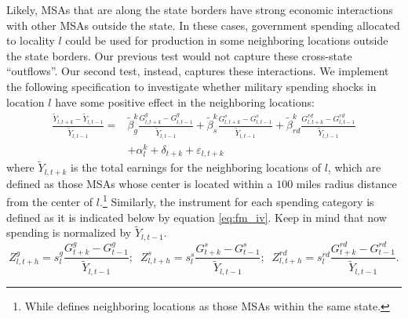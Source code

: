\documentclass[dv_diss_main.tex]{subfiles}
\begin{document}
Likely, MSAs that are along the state borders have strong economic interactions with other MSAs outside the state. In these cases, government spending allocated to locality $l$ could be used for production in some neighboring locations outside the state borders. Our previous test would not capture these cross-state ``outflows''. Our second test, instead, captures these interactions. We implement the following specification to investigate whether military spending shocks in location $l$ have some positive effect in the neighboring locations:
\begin{equation}
\begin{split}
    \frac{\tilde{Y}_{l,t+k} - \tilde{Y}_{l,t-1}}{\tilde{Y}_{l,t-1}} = & \tilde{\beta}_{g}^k \frac{G^{g}_{l,t+k}-G^{g}_{l,t-1}}{\tilde{Y}_{l,t-1}} + \tilde{\beta}_{s}^k \frac{G^{s}_{l,t+k}-G^{s}_{l,t-1}}{\tilde{Y}_{l,t-1}} + \tilde{\beta}_{rd}^k \frac{G^{rd}_{l,t+k}-G^{rd}_{l,t-1}}{\tilde{Y}_{l,t-1}} 
    \\ & + \alpha_l^k + \delta_{t+k} + \varepsilon_{l,t+k}
    \label{eq:fm_spill}
\end{split}
\end{equation}
\noindent where $\tilde{Y}_{l,t+k}$ is the total earnings for the neighboring locations of $l$, which are defined as those MSAs whose center is located within a $100$ miles radius distance from the center of $l$.\footnote{While \cite{Auerbach2020} defines neighboring locations as those MSAs within the same state.%
} Similarly, the instrument for each spending category is defined as it is indicated below by equation \ref{eq:fm_iv}. Keep in mind that now spending is normalized by $\tilde{Y}_{l,t-1}$. 
\begin{equation}
    Z_{l,t+h}^g = s_{l}^g \frac{G^g_{t+k}-G^g_{t-1}}{\tilde{Y}_{l,t-1}};\;\;Z_{l,t+h}^s = s_{l}^s \frac{G^s_{t+k}-G^s_{t-1}}{\tilde{Y}_{l,t-1}};\;\;Z_{l,t+h}^{rd} = s_{l}^{rd} \frac{G^{rd}_{t+k}-G^{rd}_{t-1}}{\tilde{Y}_{l,t-1}}
    \label{eq:fmspill_iv}.
\end{equation}
\end{document}
